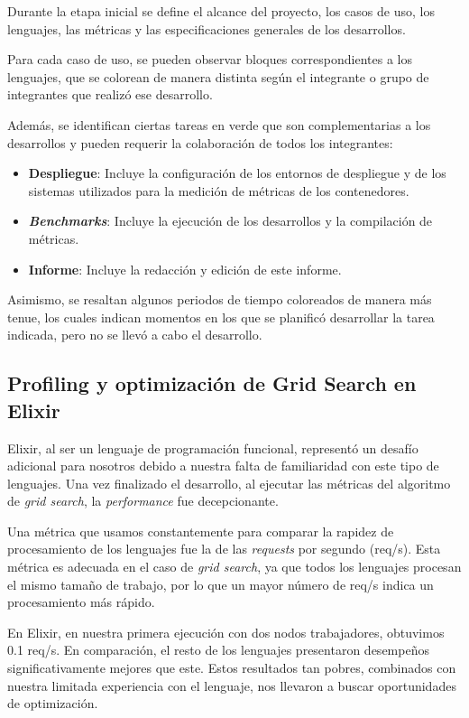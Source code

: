 \documentclass[11pt]{article}
\let\Oldsubsection\subsection
\renewcommand{\subsection}{\FloatBarrier\Oldsubsection}
\newcommand{\english}[1]{\textit{#1}}
\begin{document}
Durante la etapa inicial se define el alcance del proyecto, los casos de uso, los lenguajes, las métricas y las especificaciones generales de los desarrollos.

Para cada caso de uso, se pueden observar bloques correspondientes a los lenguajes, que se colorean de manera distinta según el integrante o grupo de integrantes que realizó ese desarrollo.

Además, se identifican ciertas tareas en verde que son complementarias a los desarrollos y pueden requerir la colaboración de todos los integrantes:
\begin{itemize}
    \item \textbf{Despliegue}: Incluye la configuración de los entornos de despliegue y de los sistemas utilizados para la medición de métricas de los contenedores.
    \item \textbf{\english{Benchmarks}}: Incluye la ejecución de los desarrollos y la compilación de métricas.
    \item \textbf{Informe}: Incluye la redacción y edición de este informe.
\end{itemize}

Asimismo, se resaltan algunos periodos de tiempo coloreados de manera más tenue, los cuales indican momentos en los que se planificó desarrollar la tarea indicada, pero no se llevó a cabo el desarrollo.

\subsection{Profiling y optimización de Grid Search en Elixir} \label{sec:anex:elixir_gs_optimization}


Elixir, al ser un lenguaje de programación funcional, representó un desafío adicional para nosotros debido a nuestra falta de familiaridad con este tipo de lenguajes. Una vez finalizado el desarrollo, al ejecutar las métricas del algoritmo de \english{grid search}, la \english{performance} fue decepcionante.

Una métrica que usamos constantemente para comparar la rapidez de procesamiento de los lenguajes fue la de las \english{requests} por segundo (req/s). Esta métrica es adecuada en el caso de \english{grid search}, ya que todos los lenguajes procesan el mismo tamaño de trabajo, por lo que un mayor número de req/s indica un procesamiento más rápido.

En Elixir, en nuestra primera ejecución con dos nodos trabajadores, obtuvimos 0.1 req/s. En comparación, el resto de los lenguajes presentaron desempeños significativamente mejores que este. Estos resultados tan pobres, combinados con nuestra limitada experiencia con el lenguaje, nos llevaron a buscar oportunidades de optimización.
\end{document}
